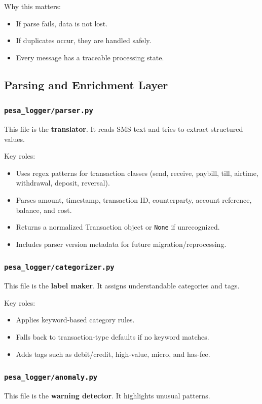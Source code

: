\documentclass[12pt,a4paper]{article}
\begin{document}
Why this matters:
\begin{itemize}[leftmargin=1.5em]
  \item If parse fails, data is not lost.
  \item If duplicates occur, they are handled safely.
  \item Every message has a traceable processing state.
\end{itemize}

\subsection{Parsing and Enrichment Layer}
\subsubsection*{\texttt{pesa\_logger/parser.py}}
This file is the \textbf{translator}. It reads SMS text and tries to extract structured values.

Key roles:
\begin{itemize}[leftmargin=1.5em]
  \item Uses regex patterns for transaction classes (send, receive, paybill, till, airtime, withdrawal, deposit, reversal).
  \item Parses amount, timestamp, transaction ID, counterparty, account reference, balance, and cost.
  \item Returns a normalized Transaction object or \texttt{None} if unrecognized.
  \item Includes parser version metadata for future migration/reprocessing.
\end{itemize}

\subsubsection*{\texttt{pesa\_logger/categorizer.py}}
This file is the \textbf{label maker}. It assigns understandable categories and tags.

Key roles:
\begin{itemize}[leftmargin=1.5em]
  \item Applies keyword-based category rules.
  \item Falls back to transaction-type defaults if no keyword matches.
  \item Adds tags such as debit/credit, high-value, micro, and has-fee.
\end{itemize}

\subsubsection*{\texttt{pesa\_logger/anomaly.py}}
This file is the \textbf{warning detector}. It highlights unusual patterns.
\end{document}
